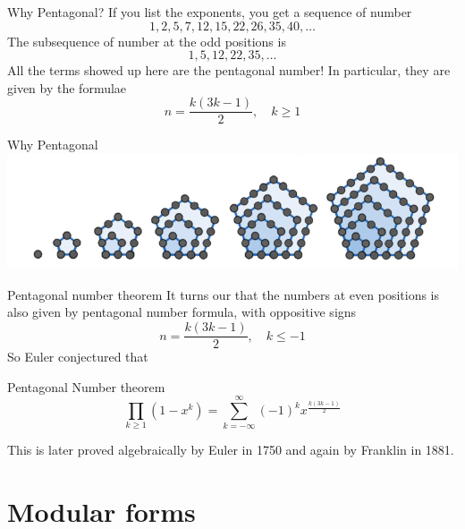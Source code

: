 \documentclass[pdf]{beamer}
\begin{document}
\begin{frame}{Why Pentagonal?}
    If you list the exponents, you get a sequence of number
    \[1, 2,5,7,12,15,22,26,35,40,\ldots\]\pause
    The subsequence of number at the odd positions is
    \[1, 5, 12, 22,35,\ldots \]\pause
    All the terms showed up here are the pentagonal number! In particular, they are given by the formulae
    \[ n = \dfrac{k(3k-1)}{2}, \quad k \ge 1\]

\end{frame}
\begin{frame}{Why Pentagonal}
    \includegraphics{The first six pentagonal number}
\end{frame}
\begin{frame}{Pentagonal number theorem}
    It turns our that the numbers at even positions is also given by pentagonal number formula, with oppositive signs
    \[n = \dfrac{k(3k-1)}{2}, \quad k \le -1\]\pause
    So  Euler conjectured that
    \begin{block}{Pentagonal Number theorem}
        \[\prod_{k \ge 1} (1-x^k) = \sum_{k=-\infty}^\infty (-1)^kx^{\frac{k(3k-1)}{2}}\]
    \end{block}\pause
    This is later proved algebraically by Euler in 1750 and again by Franklin in 1881.
\end{frame}
\section{Modular forms}
\end{document}

